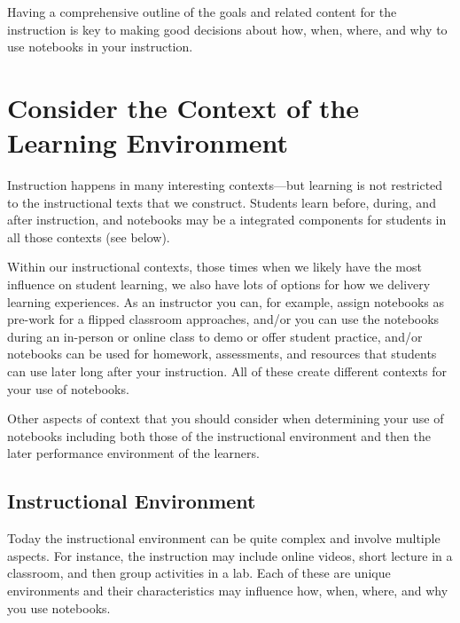 \documentclass[]{book}
\begin{document}
Having a comprehensive outline of the goals and related content for the
instruction is key to making good decisions about how, when, where, and
why to use notebooks in your instruction.

\section{Consider the Context of the Learning
Environment}\label{consider-the-context-of-the-learning-environment}

Instruction happens in many interesting contexts---but learning is not
restricted to the instructional texts that we construct. Students learn
before, during, and after instruction, and notebooks may be a integrated
components for students in all those contexts (see below).

Within our instructional contexts, those times when we likely have the
most influence on student learning, we also have lots of options for how
we delivery learning experiences. As an instructor you can, for example,
assign notebooks as pre-work for a flipped classroom approaches, and/or
you can use the notebooks during an in-person or online class to demo or
offer student practice, and/or notebooks can be used for homework,
assessments, and resources that students can use later long after your
instruction. All of these create different contexts for your use of
notebooks.

Other aspects of context that you should consider when determining your
use of notebooks including both those of the instructional environment
and then the later performance environment of the learners.

\subsection{Instructional Environment}\label{instructional-environment}

Today the instructional environment can be quite complex and involve
multiple aspects. For instance, the instruction may include online
videos, short lecture in a classroom, and then group activities in a
lab. Each of these are unique environments and their characteristics may
influence how, when, where, and why you use notebooks.
\end{document}
